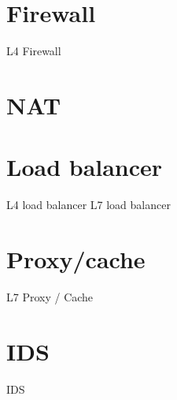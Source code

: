 \section{Firewall}

L4 Firewall

\section{NAT}

\section{Load balancer}

L4 load balancer
L7 load balancer

\section{Proxy/cache}

L7 Proxy / Cache

\section{IDS}

IDS